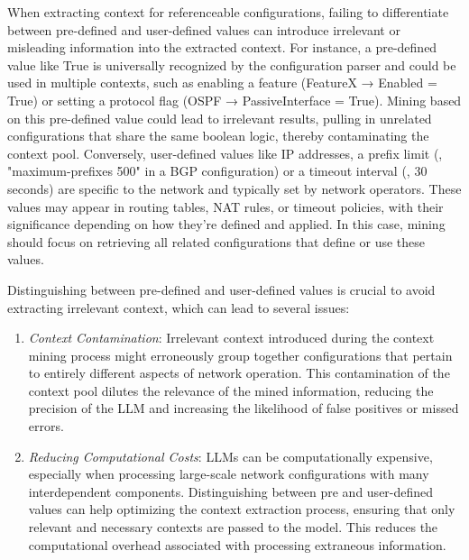 When extracting context for referenceable configurations,
failing to differentiate between pre-defined and user-defined values can introduce irrelevant or misleading information into the extracted context.
For instance, a pre-defined value like True is universally recognized by the configuration parser and could be used in multiple contexts, such as enabling a feature (FeatureX → Enabled = True) or setting a protocol flag (OSPF → PassiveInterface = True). Mining based on this pre-defined value could lead to irrelevant results, pulling in unrelated configurations that share the same boolean logic, thereby contaminating the context pool.
Conversely, user-defined values like IP addresses, a prefix limit (\eg, "maximum-prefixes 500" in a BGP configuration) or a timeout interval (\eg, 30 seconds) are specific to the network and typically set by network operators. These values may appear in routing tables, NAT rules, or timeout policies, with their significance depending on how they’re defined and applied. In this case, mining should focus on retrieving all related configurations that define or use these values.

Distinguishing between pre-defined and user-defined values is crucial to avoid extracting irrelevant context, which can lead to several issues:


\begin{enumerate}
    \item \textit{Context Contamination}: 
    Irrelevant context introduced during the context mining process might erroneously group together configurations that pertain to entirely different aspects of network operation.
    This contamination of the context pool dilutes the relevance of the mined information, reducing the precision of the LLM and increasing the likelihood of false positives or missed errors. 
    \item \textit{Reducing Computational Costs}: LLMs can be computationally expensive, especially when processing large-scale network configurations with many interdependent components. Distinguishing between pre and user-defined values can help optimizing the context extraction process, ensuring that only relevant and necessary contexts are passed to the model. This reduces the computational overhead associated with processing extraneous information.

\end{enumerate}

